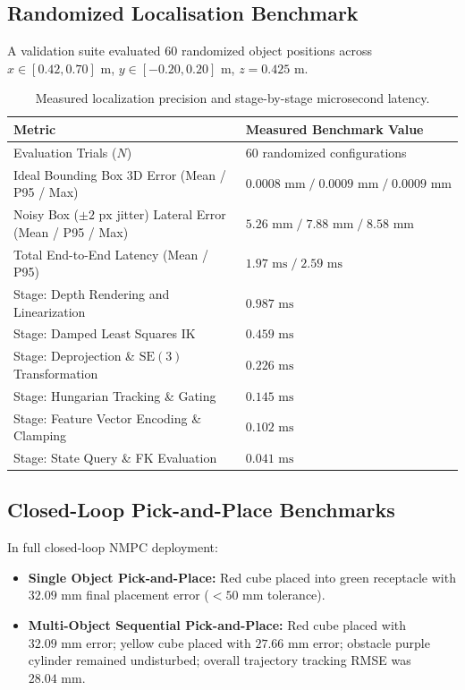 \documentclass[10pt,a4paper]{article}
\begin{document}
\subsection{Randomized Localisation Benchmark}
A validation suite evaluated 60 randomized object positions across $x \in [0.42, 0.70]\text{ m}$, $y \in [-0.20, 0.20]\text{ m}$, $z = 0.425\text{ m}$.

\begin{table}[h]
\centering
\small
\begin{tabularx}{0.75\linewidth}{Xl}
\toprule
\textbf{Metric} & \textbf{Measured Benchmark Value} \\
\midrule
Evaluation Trials ($N$) & 60 randomized configurations \\
Ideal Bounding Box 3D Error (Mean / P95 / Max) & $0.0008\text{ mm} \;/\; 0.0009\text{ mm} \;/\; 0.0009\text{ mm}$ \\
Noisy Box ($\pm 2\text{ px}$ jitter) Lateral Error (Mean / P95 / Max) & $5.26\text{ mm} \;/\; 7.88\text{ mm} \;/\; 8.58\text{ mm}$ \\
\midrule
Total End-to-End Latency (Mean / P95) & $1.97\text{ ms} \;/\; 2.59\text{ ms}$ \\
Stage: Depth Rendering and Linearization & $0.987\text{ ms}$ \\
Stage: Damped Least Squares IK & $0.459\text{ ms}$ \\
Stage: Deprojection \& $\mathrm{SE}(3)$ Transformation & $0.226\text{ ms}$ \\
Stage: Hungarian Tracking \& Gating & $0.145\text{ ms}$ \\
Stage: Feature Vector Encoding \& Clamping & $0.102\text{ ms}$ \\
Stage: State Query \& FK Evaluation & $0.041\text{ ms}$ \\
\bottomrule
\end{tabularx}
\caption{Measured localization precision and stage-by-stage microsecond latency.}
\label{tab:benchmarks}
\end{table}

\subsection{Closed-Loop Pick-and-Place Benchmarks}
In full closed-loop NMPC deployment:
\begin{itemize}
    \item \textbf{Single Object Pick-and-Place:} Red cube placed into green receptacle with $32.09\text{ mm}$ final placement error ($< 50\text{ mm}$ tolerance).
    \item \textbf{Multi-Object Sequential Pick-and-Place:} Red cube placed with $32.09\text{ mm}$ error; yellow cube placed with $27.66\text{ mm}$ error; obstacle purple cylinder remained undisturbed; overall trajectory tracking RMSE was $28.04\text{ mm}$.
\end{itemize}
\end{document}
